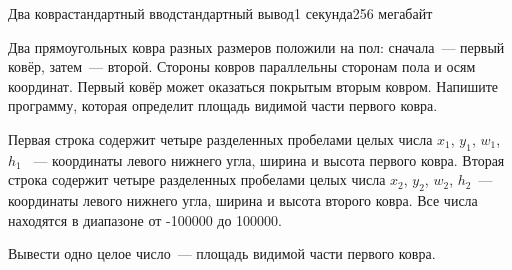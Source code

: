 \begin{problem}{Два ковра}{стандартный ввод}{стандартный вывод}{1 секунда}{256 мегабайт}

Два прямоугольных ковра разных размеров положили на пол: сначала~--- первый ковёр, затем~--- второй. Стороны ковров параллельны сторонам пола и осям координат. Первый ковёр может оказаться покрытым вторым ковром. Напишите программу, которая определит площадь видимой части первого ковра. 

\InputFile
Первая строка содержит четыре разделенных пробелами целых числа $x_1$, $y_1$, $w_1$, $h_1$ ~--- координаты левого нижнего угла, ширина и высота первого ковра. Вторая строка содержит четыре разделенных пробелами целых числа $x_2$, $y_2$, $w_2$, $h_2$~--- координаты левого нижнего угла, ширина и высота второго ковра. Все числа находятся в диапазоне от -100000 до 100000.

\OutputFile
Вывести одно целое число~--- площадь видимой части первого ковра.

\Examples

\begin{example}
%
%
\end{example}

\end{problem}


